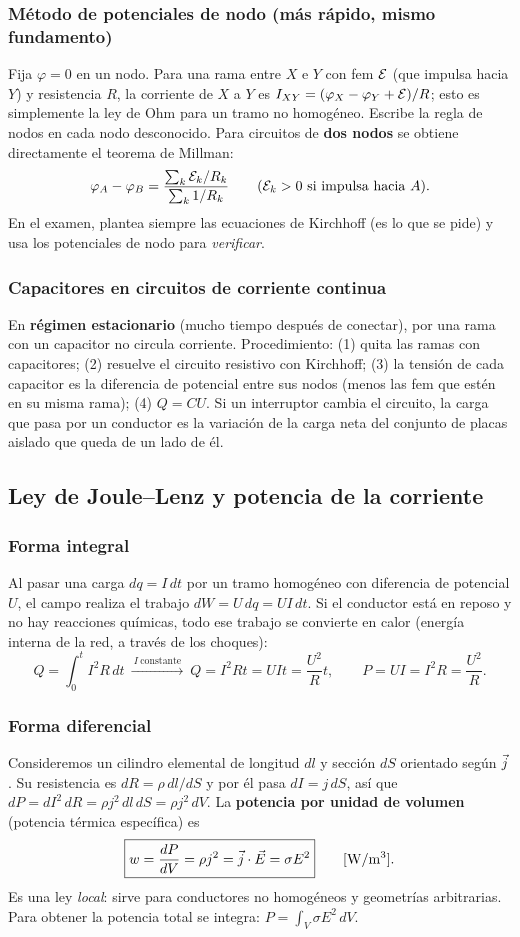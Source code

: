 \documentclass[11pt]{article}
\begin{document}
\subsubsection*{Método de potenciales de nodo (más rápido, mismo fundamento)}
Fija $\varphi=0$ en un nodo. Para una rama entre $X$ e $Y$ con fem $\mathcal{E}$ (que impulsa hacia $Y$) y resistencia $R$, la corriente de $X$ a $Y$ es $I_{XY}=(\varphi_X-\varphi_Y+\mathcal{E})/R$; esto es simplemente la ley de Ohm para un tramo no homogéneo. Escribe la regla de nodos en cada nodo desconocido. Para circuitos de \textbf{dos nodos} se obtiene directamente el teorema de Millman:
\[
\varphi_A-\varphi_B=\frac{\sum_k \mathcal{E}_k/R_k}{\sum_k 1/R_k}\qquad(\mathcal{E}_k>0\ \text{si impulsa hacia }A).
\]
En el examen, plantea siempre las ecuaciones de Kirchhoff (es lo que se pide) y usa los potenciales de nodo para \emph{verificar}.

\subsubsection*{Capacitores en circuitos de corriente continua}
En \textbf{régimen estacionario} (mucho tiempo después de conectar), por una rama con un capacitor no circula corriente. Procedimiento: (1) quita las ramas con capacitores; (2) resuelve el circuito resistivo con Kirchhoff; (3) la tensión de cada capacitor es la diferencia de potencial entre sus nodos (menos las fem que estén en su misma rama); (4) $Q=CU$. Si un interruptor cambia el circuito, la carga que pasa por un conductor es la variación de la carga neta del conjunto de placas aislado que queda de un lado de él.

\subsection{Ley de Joule--Lenz y potencia de la corriente}
\subsubsection*{Forma integral}
Al pasar una carga $dq=I\,dt$ por un tramo homogéneo con diferencia de potencial $U$, el campo realiza el trabajo $dW=U\,dq=UI\,dt$. Si el conductor está en reposo y no hay reacciones químicas, todo ese trabajo se convierte en calor (energía interna de la red, a través de los choques):
\[
\boxed{Q=\int_0^t I^2R\,dt}\ \xrightarrow{\ I\ \text{constante}\ }\ Q=I^2Rt=UIt=\frac{U^2}{R}t,\qquad P=UI=I^2R=\frac{U^2}{R}.
\]
\subsubsection*{Forma diferencial}
Consideremos un cilindro elemental de longitud $dl$ y sección $dS$ orientado según $\vec{j}$. Su resistencia es $dR=\rho\,dl/dS$ y por él pasa $dI=j\,dS$, así que $dP=dI^2\,dR=\rho j^2\,dl\,dS=\rho j^2\,dV$. La \textbf{potencia por unidad de volumen} (potencia térmica específica) es
\[
\boxed{w=\frac{dP}{dV}=\rho j^2=\vec{j}\cdot\vec{E}=\sigma E^2}\qquad[\mathrm{W/m^3}].
\]
Es una ley \emph{local}: sirve para conductores no homogéneos y geometrías arbitrarias. Para obtener la potencia total se integra: $P=\int_V\sigma E^2\,dV$.
\end{document}
